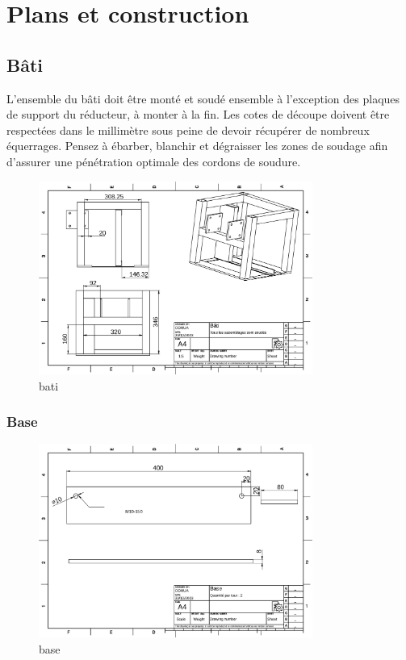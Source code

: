 \documentclass[a4paper]{article}
\begin{document}
\section{Plans et construction}
\subsection{Bâti}
L'ensemble du bâti doit être monté et soudé ensemble à l'exception des plaques de support du réducteur, à monter à la fin. 
Les cotes de découpe doivent être respectées dans le millimètre sous peine de devoir récupérer de nombreux équerrages. 
Pensez à ébarber, blanchir et dégraisser les zones de soudage afin d'assurer une pénétration optimale des cordons de soudure.
\begin{figure}[H]
    \centering
    \includegraphics*[width=0.8\textwidth]{../plans/bati}
    \caption{bati}
    \label{fig:bati}
\end{figure}

\subsubsection{Base}
\begin{figure}[H]
    \centering
    \includegraphics*[width=0.8\textwidth]{../plans/base}
    \caption{base}
    \label{fig:base}
\end{figure}
\end{document}
